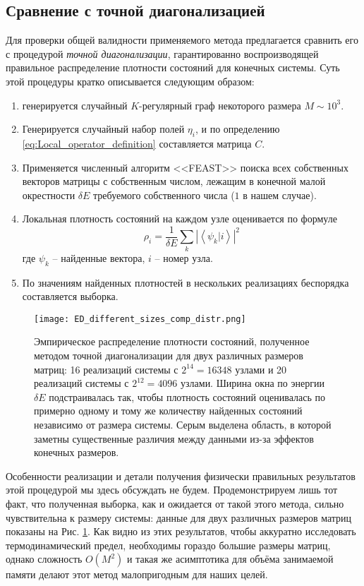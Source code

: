 \subsection{Сравнение с точной диагонализацией}
Для проверки общей валидности применяемого метода предлагается сравнить его с процедурой \textit{точной диагонализации}, гарантированно воспроизводящей правильное распределение плотности состояний для конечных системы. Суть этой процедуры кратко описывается следующим образом:
\begin{enumerate}
	\item генерируется случайный $K$-регулярный граф некоторого размера $M \sim 10^3$.
	\item Генерируется случайный набор полей $\eta_i$, и по определению \eqref{eq:Local_operator_definition} составляется матрица $C$. 
	\item Применяется численный алгоритм <<FEAST>> поиска всех собственных векторов матрицы с собственным числом, лежащим в конечной малой окрестности $\delta E$ требуемого собственного числа ($1$ в нашем случае).
	\item Локальная плотность состояний на каждом узле оценивается по формуле
	$$
	\rho_i = \frac{1}{\delta E} \sum_k \left| \left\langle \psi_k | i \right\rangle \right|^2
	$$
	где $\psi_k$ -- найденные вектора, $i$ -- номер узла.
	\item По значениям найденных плотностей в нескольких реализациях беспорядка составляется выборка.
\end{enumerate}

\begin{figure}[h!]
	\label{fig:Exact_digonalization_different_matrix_sizes}
	\centering
	\texttt{[image: ED\_different\_sizes\_comp\_distr.png]}
	\caption{Эмпирическое распределение плотности состояний, полученное методом точной диагонализации для двух различных размеров матриц: 16 реализаций системы с $2^{14} = 16348$ узлами и 20 реализаций системы с $2^{12} = 4096$ узлами. Ширина окна по энергии $\delta E$ подстраивалась так, чтобы плотность состояний оценивалась по примерно одному и тому же количеству найденных состояний независимо от размера системы. Серым выделена область, в которой заметны существенные различия между данными из-за эффектов конечных размеров.}
\end{figure}

Особенности реализации и детали получения физически правильных результатов этой процедурой мы здесь обсуждать не будем. Продемонстрируем лишь тот факт, что полученная выборка, как и ожидается от такой этого метода, сильно чувствительна к размеру системы: данные для двух различных размеров матриц показаны на Рис. \ref{fig:Exact_digonalization_different_matrix_sizes}. Как видно из этих результатов, чтобы аккуратно исследовать термодинамический предел, необходимы гораздо большие размеры матриц, однако сложность $O(M^2)$ и такая же асимптотика для объёма занимаемой памяти делают этот метод малопригодным для наших целей.

